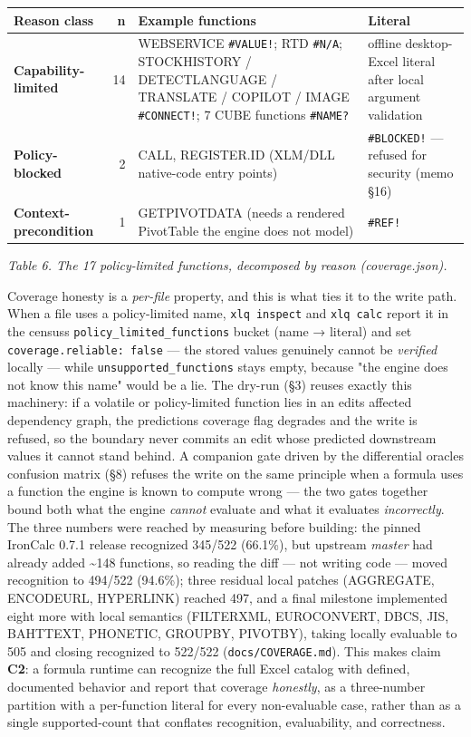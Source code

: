 \documentclass[
]{article}
\newcounter{none} %
\begin{document}
{\def\LTcaptype{none} %
\begin{longtable}[]{@{}lrll@{}}
\toprule\noalign{}
Reason class & n & Example functions & Literal \\
\midrule\noalign{}
\endhead
\bottomrule\noalign{}
\endlastfoot
\textbf{Capability-limited} & 14 & WEBSERVICE \texttt{\#VALUE!}; RTD
\texttt{\#N/A}; STOCKHISTORY / DETECTLANGUAGE / TRANSLATE / COPILOT /
IMAGE \texttt{\#CONNECT!}; 7 CUBE functions \texttt{\#NAME?} & offline
desktop-Excel literal after local argument validation \\
\textbf{Policy-blocked} & 2 & CALL, REGISTER.ID (XLM/DLL native-code
entry points) & \texttt{\#BLOCKED!} --- refused for security (memo
§16) \\
\textbf{Context-precondition} & 1 & GETPIVOTDATA (needs a rendered
PivotTable the engine does not model) & \texttt{\#REF!} \\
\end{longtable}
}

\emph{Table 6. The 17 policy-limited functions, decomposed by reason
(coverage.json).}

Coverage honesty is a \emph{per-file} property, and this is what ties it
to the write path. When a file uses a policy-limited name,
\texttt{xlq\ inspect} and \texttt{xlq\ calc} report it in the
census\textquotesingle s \texttt{policy\_limited\_functions} bucket
(name → literal) and set \texttt{coverage.reliable:\ false} --- the
stored values genuinely cannot be \emph{verified} locally --- while
\texttt{unsupported\_functions} stays empty, because "the engine does
not know this name" would be a lie. The dry-run (§3) reuses exactly this
machinery: if a volatile or policy-limited function lies in an
edit\textquotesingle s affected dependency graph, the
prediction\textquotesingle s coverage flag degrades and the write is
refused, so the boundary never commits an edit whose predicted
downstream values it cannot stand behind. A companion gate driven by the
differential oracle\textquotesingle s confusion matrix (§8) refuses the
write on the same principle when a formula uses a function the engine is
known to compute wrong --- the two gates together bound both what the
engine \emph{cannot} evaluate and what it evaluates \emph{incorrectly}.
The three numbers were reached by measuring before building: the pinned
IronCalc 0.7.1 release recognized 345/522 (66.1\%), but upstream
\emph{master} had already added \textasciitilde148 functions, so reading
the diff --- not writing code --- moved recognition to 494/522 (94.6\%);
three residual local patches (AGGREGATE, ENCODEURL, HYPERLINK) reached
497, and a final milestone implemented eight more with local semantics
(FILTERXML, EUROCONVERT, DBCS, JIS, BAHTTEXT, PHONETIC, GROUPBY,
PIVOTBY), taking locally evaluable to 505 and closing recognized to
522/522 (\texttt{docs/COVERAGE.md}). This makes claim \textbf{C2}: a
formula runtime can recognize the full Excel catalog with defined,
documented behavior and report that coverage \emph{honestly}, as a
three-number partition with a per-function literal for every
non-evaluable case, rather than as a single supported-count that
conflates recognition, evaluability, and correctness.
\end{document}
